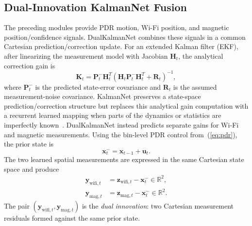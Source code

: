 \documentclass[conference]{IEEEtran}
\begin{document}
\subsection{Dual-Innovation KalmanNet Fusion}\label{sec:kalmannet}

The preceding modules provide PDR motion, Wi-Fi position, and magnetic position/confidence signals. DualKalmanNet combines these signals in a common Cartesian prediction/correction update. For an extended Kalman filter (EKF), after linearizing the measurement model with Jacobian $\mathbf{H}_t$, the analytical correction gain is
\begin{equation}
\mathbf{K}_t=\mathbf{P}_t^-\mathbf{H}_t^T
\left(\mathbf{H}_t\mathbf{P}_t^-\mathbf{H}_t^T+\mathbf{R}_t\right)^{-1},
\label{eq:ekf_gain}
\end{equation}
where $\mathbf{P}_t^-$ is the predicted state-error covariance and $\mathbf{R}_t$ is the assumed measurement-noise covariance. KalmanNet preserves a state-space prediction/correction structure but replaces this analytical gain computation with a recurrent learned mapping when parts of the dynamics or statistics are imperfectly known~\cite{kalmannet}. DualKalmanNet instead predicts separate gains for Wi-Fi and magnetic measurements. Using the bin-level PDR control from~(\ref{eq:pdr}), the prior state is
\begin{equation}
\mathbf{x}_{t}^{-}=\mathbf{x}_{t-1}+\mathbf{u}_t.
\label{eq:kn_predict}
\end{equation}
The two learned spatial measurements are expressed in the same Cartesian state space and produce
\begin{align}
\mathbf{y}_{\mathrm{wifi},t}
&=\mathbf{z}_{\mathrm{wifi},t}-\mathbf{x}_{t}^{-}
\in\mathbb{R}^{2},
\label{eq:kn_innovate_w}\\
\mathbf{y}_{\mathrm{mag},t}
&=\mathbf{z}_{\mathrm{mag},t}-\mathbf{x}_{t}^{-}
\in\mathbb{R}^{2}.
\label{eq:kn_innovate_m}
\end{align}
The pair $(\mathbf{y}_{\mathrm{wifi},t},\mathbf{y}_{\mathrm{mag},t})$ is the \emph{dual innovation}: two Cartesian measurement residuals formed against the same prior state.
\end{document}
